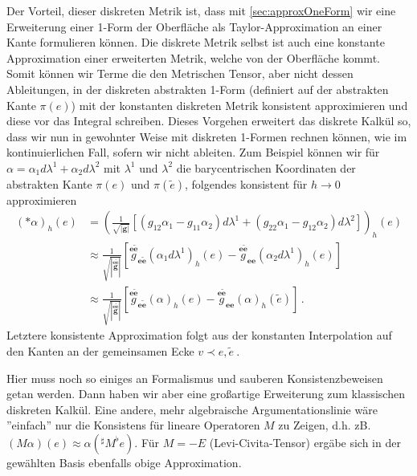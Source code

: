 \documentclass[a4paper,11pt]{scrartcl}
\newcommand{\g}{\mathbf{g}} %
\newcommand{\vect}[1]{\mathbf{#1}}
\newcommand{\flatgb}[2]{\overset{#1 #2}{\g}}
\newcommand{\flatg}[2]{\overset{#1 #2}{g}}
\newcommand{\formPeriod}{\,\text{.}}
\newcommand{\ingo}[1]{{\color{blue}#1}}
\begin{document}
      Der Vorteil, dieser diskreten Metrik ist, dass mit \autoref{sec:approxOneForm} wir eine Erweiterung einer 1-Form der Oberfläche als Taylor-Approximation an einer Kante formulieren
      können. Die diskrete Metrik selbst ist auch eine konstante Approximation einer erweiterten Metrik, welche von der Oberfläche kommt.
      Somit können wir Terme die den Metrischen Tensor, aber nicht dessen Ableitungen, in der diskreten abstrakten 1-Form (definiert auf der abstrakten Kante \( \pi(e) \))
      mit der konstanten diskreten Metrik konsistent approximieren und diese vor das Integral schreiben.
      Dieses Vorgehen erweitert das diskrete Kalkül so, dass wir nun in gewohnter Weise mit diskreten 1-Formen rechnen können, wie im kontinuierlichen Fall, sofern wir nicht ableiten.
      Zum Beispiel können wir für \( \alpha = \alpha_{1}d\lambda^{1} + \alpha_{2}d\lambda^{2} \) mit \( \lambda^{1} \) und \( \lambda^{2} \) die
      barycentrischen Koordinaten der abstrakten Kante \( \pi(e) \) und \( \pi(\tilde{e}) \), folgendes konsistent für \( h\rightarrow 0 \) approximieren
      \begin{align}
        \left( *\alpha \right)_{h}(e)
            &= \left( \frac{1}{\sqrt{|\g|}}\left[ \left( g_{12}\alpha_{1} - g_{11}\alpha_{2} \right)d\lambda^{1} 
                                          +\left( g_{22}\alpha_{1} - g_{12}\alpha_{2} \right)d\lambda^{2}\right] \right)_{h}(e) \\
            &\approx \frac{1}{\sqrt{\left| \flatgb{\vect{e}}{\tilde{\vect{e}}} \right|}}
                \left[ \flatg{\vect{e}}{\tilde{\vect{e}}}_{\vect{e}\tilde{\vect{e}}}\left( \alpha_{1}d\lambda^{1} \right)_{h}(e) 
                      -\flatg{\vect{e}}{\tilde{\vect{e}}}_{\vect{e}\vect{e}}\left( \alpha_{2}d\lambda^{1} \right)_{h}(e) \right] \\
            &\approx \frac{1}{\sqrt{\left| \flatgb{\vect{e}}{\tilde{\vect{e}}} \right|}}
                \left[ \flatg{\vect{e}}{\tilde{\vect{e}}}_{\vect{e}\tilde{\vect{e}}}\left( \alpha \right)_{h}(e) 
                      -\flatg{\vect{e}}{\tilde{\vect{e}}}_{\vect{e}\vect{e}}\left( \alpha \right)_{h}(\tilde{e}) \right] \formPeriod\label{eq:hodgeApproxTwoEdges}
      \end{align}
      Letztere konsistente Approximation folgt aus der konstanten Interpolation auf den Kanten an der gemeinsamen Ecke \( v\prec e , \tilde{e}\ \).

      \ingo{Hier muss noch so einiges an Formalismus und sauberen Konsistenzbeweisen getan werden. Dann haben wir aber eine großartige Erweiterung zum klassischen diskreten Kalkül.
            Eine andere, mehr algebraische Argumentationslinie wäre ''einfach'' nur die Konsistens für lineare Operatoren \( M \) zu Zeigen, 
            d.h. zB.\( (M\alpha)(e) \approx \alpha(^{\sharp}M^{\flat} e) \). 
            Für \( M=-E \) (Levi-Civita-Tensor) ergäbe sich in der gewählten Basis ebenfalls obige Approximation.}
\end{document}
